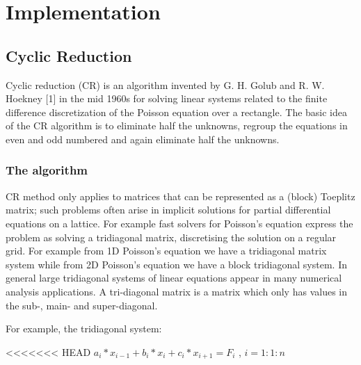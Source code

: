 \chapter{Implementation}

\section{Cyclic Reduction}


Cyclic reduction (CR) is an algorithm invented by G. H. Golub and R. W. Hoekney [1] in the mid 1960s for solving linear systems related to the finite difference discretization of the Poisson equation over a rectangle. 
The basic idea of the CR algorithm is to eliminate half the unknowns, regroup the equations in even and odd numbered and again eliminate half the unknowns.


\subsection{The algorithm}

CR method only applies to matrices that can be represented as a (block) Toeplitz matrix; such problems often arise in implicit solutions for partial differential equations on a lattice. For example fast solvers for Poisson's equation express the problem as solving a tridiagonal matrix, discretising the solution on a regular grid. For example from 1D Poisson’s equation we have a tridiagonal matrix system while from 2D Poisson’s equation we have a block tridiagonal system.
In general large tridiagonal systems of linear equations appear in many numerical analysis applications. A tri-diagonal matrix is a matrix which only has values in the sub-, main- and super-diagonal.

For example, the tridiagonal system:

<<<<<<< HEAD
$a_i*x_{i-1} + b_i*x_i+c_i*x_{i+1} = F_{i}$  , \hspace*{2cm} $ i=1:1:n$

